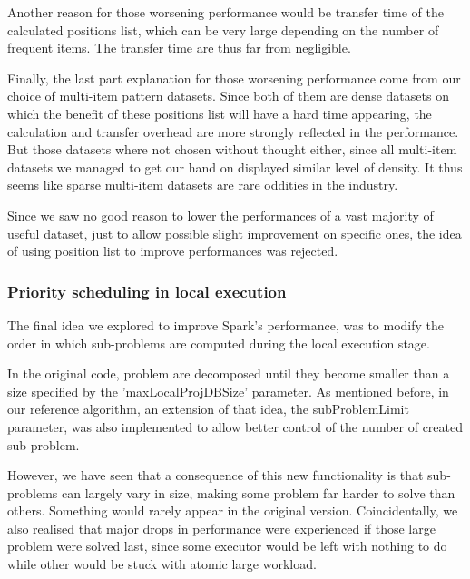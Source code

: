 \documentclass{eplmastersthesis}
\begin{document}
Another reason for those worsening performance would be transfer time of the calculated positions list, which can be very large depending on the number of frequent items. The transfer time are thus far from negligible.

Finally, the last part explanation for those worsening performance come from our choice of multi-item pattern datasets. Since both of them are dense datasets on which the benefit of these positions list will have a hard time appearing, the calculation and transfer overhead are more strongly reflected in the performance. But those datasets where not chosen without thought either, since all multi-item datasets we managed to get our hand on displayed similar level of density. It thus seems like sparse multi-item datasets are rare oddities in the industry. \newline


Since we saw no good reason to lower the performances of a vast majority of useful dataset, just to allow possible slight improvement on specific ones, the idea of using position list to improve performances was rejected.


\subsubsection{Priority scheduling in local execution}

The final idea we explored to improve Spark's performance, was to modify the order in which sub-problems are computed during the local execution stage. \newline

In the original code, problem are decomposed until they become smaller than a size specified by the 'maxLocalProjDBSize' parameter. As mentioned before, in our reference algorithm, an extension of that idea, the subProblemLimit parameter, was also implemented to allow better control of the number of created sub-problem. \newline

However, we have seen that a consequence of this new functionality is that sub-problems can largely vary in size, making some problem far harder to solve than others. Something would rarely appear in the original version. Coincidentally, we also realised that major drops in performance were experienced if those large problem were solved last, since some executor would be left with nothing to do while other would be stuck with atomic large workload.
\newline
\end{document}
